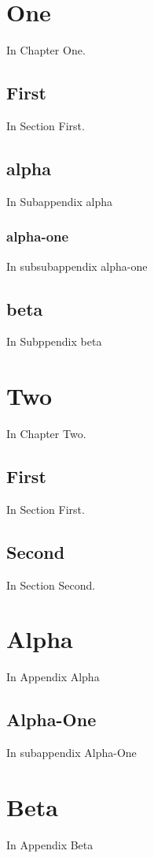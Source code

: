 \documentclass{book}
\begin{document}
\chapter{One} In Chapter One.
\section{First} In Section First.
\begin{subappendices}
\section{alpha} In Subappendix alpha
\subsection{alpha-one} In subsubappendix alpha-one
\section{beta} In Subppendix beta
\end{subappendices}  

\chapter{Two} In Chapter Two.
\section{First} In Section First.
\section{Second} In Section Second.
\begin{appendices}
\chapter{Alpha} In Appendix Alpha
\section{Alpha-One} In subappendix Alpha-One
\chapter{Beta} In Appendix Beta
\end{appendices}
\end{document}
